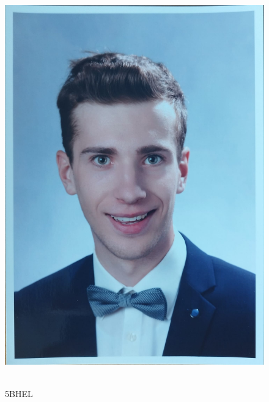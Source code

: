 \begin{figure}[h]
  \centering
  \begin{adjustbox}{valign=c}
    \includegraphics[scale=0.08]{image/Julius.jpeg}
  \end{adjustbox}
  \hfill
  \begin{minipage}[b]{0.7\textwidth}
    \textbf{\nameJS} \\ 5BHEL
  \end{minipage}
  \captionsetup{justification=raggedright,singlelinecheck=false}
  \caption{\nameJS}
\end{figure}
\newpage
